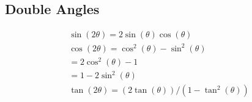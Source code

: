\documentclass[12pt letter]{report}
\begin{document}
\subsection{Double Angles}
\begin{align*}
	\sin(2\theta) = 2\sin(\theta) \cos(\theta)      \\
	\cos(2\theta) = \cos^2(\theta) - \sin^2(\theta) \\
	= 2\cos^2(\theta) - 1                           \\
	= 1- 2 \sin^2(\theta)                           \\
	\tan(2\theta)= (2\tan(\theta))/(1 - \tan^2(\theta))
\end{align*}
\end{document}
